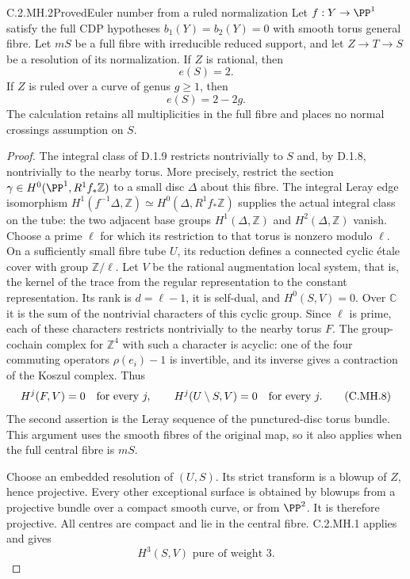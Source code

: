 \begin{statement}{C.2.MH.2}{Proved}{Euler number from a ruled normalization}
Let $f:Y\to\PP^1$ satisfy the full CDP hypotheses
$b_1(Y)=b_2(Y)=0$ with smooth torus general fibre.
Let $mS$ be a full fibre with irreducible reduced support,
and let $Z\to T\to S$ be a resolution of its
normalization. If $Z$ is rational, then
\[
                              e(S)=2.
 \tag{C.MH.6}
\]
If $Z$ is ruled over a curve of genus $g\ge1$, then
\[
                              e(S)=2-2g.
 \tag{C.MH.7}
\]
The calculation retains all multiplicities in the full
fibre and places no normal crossings assumption on $S$.
\end{statement}
\begin{proof}
The integral class of D.1.9 restricts nontrivially to
$S$ and, by D.1.8, nontrivially to the nearby torus.
More precisely, restrict the section
$\gamma\in H^0(\PP^1,R^1f_*\mathbb Z)$ to a small
disc $\Delta$ about this fibre. The integral Leray edge
isomorphism
$H^1(f^{-1}\Delta,\mathbb Z)
 \simeq H^0(\Delta,R^1f_*\mathbb Z)$ supplies the
actual integral class on the tube: the two adjacent
base groups $H^1(\Delta,\mathbb Z)$ and
$H^2(\Delta,\mathbb Z)$ vanish.
Choose a prime $\ell$ for which its restriction to that
torus is nonzero modulo $\ell$. On a sufficiently small
fibre tube $U$, its reduction defines a connected cyclic
\'{e}tale cover with group $\mathbb Z/\ell$. Let $V$ be
the rational augmentation local system, that is, the
kernel of the trace from the regular representation
to the constant representation. Its rank is
$d=\ell-1$, it is self-dual, and $H^0(S,V)=0$.
Over $\mathbb C$ it is the sum of the nontrivial
characters of this cyclic group. Since $\ell$ is prime,
each of these characters restricts nontrivially to
the nearby torus $F$. The group-cochain complex for
$\mathbb Z^4$ with such a character is acyclic: one of
the four commuting operators $\rho(e_i)-1$ is
invertible, and its inverse gives a contraction of the
Koszul complex. Thus
\[
 H^j(F,V)=0\quad\hbox{for every }j,
 \qquad H^j(U\setminus S,V)=0\quad\hbox{for every }j.
 \tag{C.MH.8}
\]
The second assertion is the Leray sequence of the
punctured-disc torus bundle. This argument uses the
smooth fibres of the original map, so it also applies
when the full central fibre is $mS$.

Choose an embedded resolution of $(U,S)$. Its strict
transform is a blowup of $Z$, hence projective. Every
other exceptional surface is obtained by blowups from
a projective bundle over a compact smooth curve, or
from $\PP^2$. It is therefore projective. All centres
are compact and lie in the central fibre. C.2.MH.1
applies and gives
\[
                         H^3(S,V)\text{ pure of weight }3.
 \tag{C.MH.9}
\]


\end{proof}
